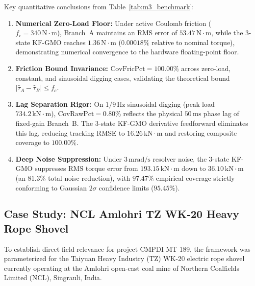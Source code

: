 \documentclass[journal]{IEEEtran}
\begin{document}
Key quantitative conclusions from Table~\ref{tab:m3_benchmark}:
\begin{enumerate}
    \item \textbf{Numerical Zero-Load Floor:} Under active Coulomb friction ($f_c = 340\,\mathrm{N\cdot m}$), Branch~A maintains an RMS error of $53.47\,\mathrm{N\cdot m}$, while the 3-state KF-GMO reaches $1.36\,\mathrm{N\cdot m}$ ($0.00018\%$ relative to nominal torque), demonstrating numerical convergence to the hardware floating-point floor.
    \item \textbf{Friction Bound Invariance:} $\mathrm{CovFricPct} = 100.00\%$ across zero-load, constant, and sinusoidal digging cases, validating the theoretical bound $| \hat{\tau}_A - \hat{\tau}_B | \le f_c$.
    \item \textbf{Lag Separation Rigor:} On $1/9\,\mathrm{Hz}$ sinusoidal digging (peak load $734.2\,\mathrm{kN\cdot m}$), $\mathrm{CovRawPct} = 0.80\%$ reflects the physical $50\,\mathrm{ms}$ phase lag of fixed-gain Branch~B. The 3-state KF-GMO derivative feedforward eliminates this lag, reducing tracking RMSE to $16.26\,\mathrm{kN\cdot m}$ and restoring composite coverage to $100.00\%$.
    \item \textbf{Deep Noise Suppression:} Under $3\,\mathrm{mrad/s}$ resolver noise, the 3-state KF-GMO suppresses RMS torque error from $193.15\,\mathrm{kN\cdot m}$ down to $36.10\,\mathrm{kN\cdot m}$ (an $81.3\%$ total noise reduction), with $97.47\%$ empirical coverage strictly conforming to Gaussian $2\sigma$ confidence limits ($95.45\%$).
\end{enumerate}

\subsection{Case Study: NCL Amlohri TZ WK-20 Heavy Rope Shovel}
To establish direct field relevance for project CMPDI MT-189, the framework was parameterized for the Taiyuan Heavy Industry (TZ) WK-20 electric rope shovel currently operating at the Amlohri open-cast coal mine of Northern Coalfields Limited (NCL), Singrauli, India.
\end{document}
